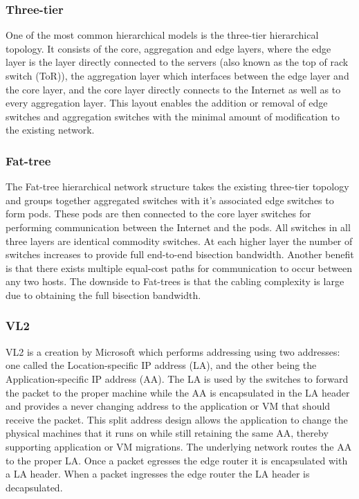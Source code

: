 \documentclass[12pt]{article}
\begin{document}
\subsubsection{Three-tier} \label{subp:three-tier}

One of the most common hierarchical models is the three-tier hierarchical topology. It consists of the core, aggregation and edge layers, where the edge layer is the layer directly connected to the servers (also known as the top of rack switch (ToR)), the aggregation layer which interfaces between the edge layer and the core layer, and the core layer directly connects to the Internet as well as to every aggregation layer. This layout enables the addition or removal of edge switches and aggregation switches with the minimal amount of modification to the existing network.

\subsubsection{Fat-tree} \label{subp:fat-tree}

The Fat-tree hierarchical network structure takes the existing three-tier topology and groups together aggregated switches with it's associated edge switches to form pods. These pods are then connected to the core layer switches for performing communication between the Internet and the pods. All switches in all three layers are identical commodity switches. At each higher layer the number of switches increases to provide full end-to-end bisection bandwidth. Another benefit is that there exists multiple equal-cost paths for communication to occur between any two hosts. The downside to Fat-trees is that the cabling complexity is large due to obtaining the full bisection bandwidth.

\subsubsection{VL2} \label{subp:vl2}

VL2 is a creation by Microsoft which performs addressing using two addresses: one called the Location-specific IP address (LA), and the other being the Application-specific IP address (AA). The LA is used by the switches to forward the packet to the proper machine while the AA is encapsulated in the LA header and provides a never changing address to the application or VM that should receive the packet. This split address design allows the application to change the physical machines that it runs on while still retaining the same AA, thereby supporting application or VM migrations. The underlying network routes the AA to the proper LA. Once a packet egresses the edge router it is encapsulated with a LA header. When a packet ingresses the edge router the LA header is decapsulated.
\end{document}
